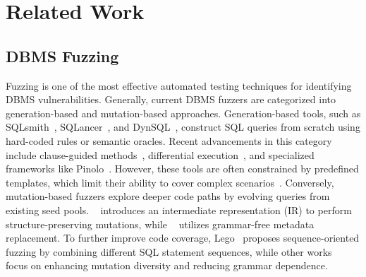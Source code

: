 \documentclass[sigconf,review,anonymous]{acmart}
\begin{document}



\section{Related Work}
\label{sec:related_work}


\subsection{DBMS Fuzzing}
Fuzzing is one of the most effective automated testing techniques for identifying DBMS vulnerabilities.
Generally, current DBMS fuzzers are categorized into generation-based and mutation-based approaches. Generation-based tools, such as SQLsmith~\cite{sqlsmith}, SQLancer~\cite{sqlancer, rigger2020testing}, and DynSQL~\cite{jiang2023dynsql}, construct SQL queries from scratch using hard-coded rules or semantic oracles. Recent advancements in this category include clause-guided methods~\cite{wei2024sqlaser, ba2023testing}, differential execution~\cite{song2023testing, cui2022differentially}, and specialized frameworks like Pinolo~\cite{hao2023pinolo}. However, these tools are often constrained by predefined templates, which limit their ability to cover complex scenarios~\cite{gao2023comprehensive}. Conversely, mutation-based fuzzers explore deeper code paths by evolving queries from existing seed pools. 
\squirrel{}~\cite{zhong2020squirrel} introduces an intermediate representation (IR) to perform structure-preserving mutations, while \griffin{}~\cite{fu2022griffin} utilizes grammar-free metadata replacement. To further improve code coverage, Lego~\cite{liang2023sequence} proposes sequence-oriented fuzzing by combining different SQL statement sequences, while other works~\cite{yang2024towards} focus on enhancing mutation diversity and reducing grammar dependence. 
\end{document}
